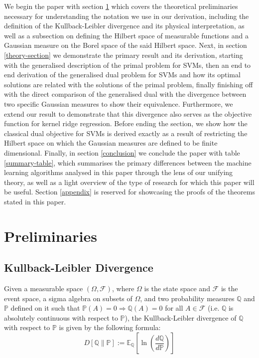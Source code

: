 \documentclass{article}
\begin{document}
We begin the paper with section \ref{preliminaries} which covers the theoretical preliminaries necessary for understanding the notation we use in our derivation, including the definition of the Kullback-Leibler divergence and its physical interpretation, as well as a subsection on defining the Hilbert space of measurable functions and a Gaussian measure on the Borel space of the said Hilbert space. Next, in section \ref{theory-section} we demonstrate the primary result and its derivation, starting with the generalised description of the primal problem for SVMs, then an end to end derivation of the generalised dual problem for SVMs and how its optimal solutions are related with the solutions of the primal problem, finally finishing off with the direct comparison of the generalised dual with the divergence between two specific Gaussian measures to show their equivalence. Furthermore, we extend our result to demonstrate that this divergence also serves as the objective function for kernel ridge regression. Before ending the section, we show how the classical dual objective for SVMs is derived exactly as a result of restricting the Hilbert space on which the Gaussian measures are defined to be finite dimensional. Finally, in section \ref{conclusion} we conclude the paper with table \ref{summary-table}, which summarises the primary differences between the machine learning algorithms analysed in this paper through the lens of our unifying theory, as well as a light overview of the type of research for which this paper will be useful. Section \ref{appendix} is reserved for showcasing the proofs of the theorems stated in this paper.

\section{Preliminaries} \label{preliminaries}

\subsection{Kullback-Leibler Divergence} \label{divergence-section}

Given a measurable space $(\Omega , \mathcal{F})$, where $\Omega$ is the state space and $\mathcal{F}$ is the event space, a sigma algebra on subsets of $\Omega$, and two probability measures $\mathbb{Q}$ and $\mathbb{P}$ defined on it such that $\mathbb{P}(A)= 0 \Rightarrow \mathbb{Q}(A) = 0$ for all $A \in \mathcal{F}$ (i.e. $\mathbb{Q}$ is absolutely continuous with respect to $\mathbb{P}$), the Kullback-Leibler divergence of $\mathbb{Q}$ with respect to $\mathbb{P}$ is given by the following formula:
\begin{equation}\label{kl-divergence}
D[\mathbb{Q}\|\mathbb{P}] := \mathbb{E}_{\mathbb{Q}}\left[ \ln \left(\frac{d\mathbb{Q}}{d\mathbb{P}}\right)\right]
\end{equation}
\end{document}
